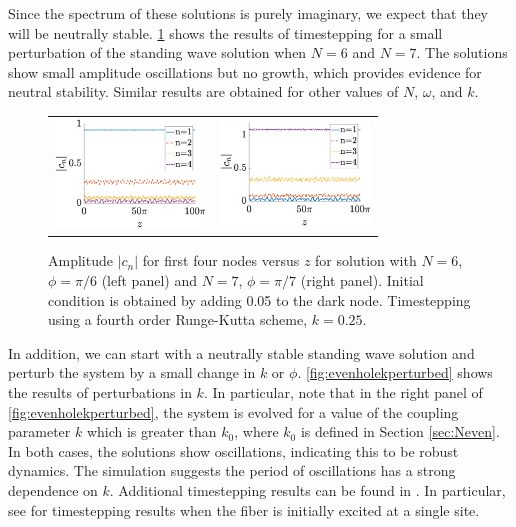 \documentclass[reprint, amsmath,amssymb,aps,pra]{revtex4-2}
\begin{document}
Since the spectrum of these solutions is purely imaginary, we expect that they will be neutrally stable.  \cref{fig:evenhole6perturbed} shows the results of timestepping for a small perturbation of the standing wave solution when $N=6$ and $N=7$. The solutions show small amplitude oscillations but no growth, which provides evidence for neutral stability. Similar results are obtained for other values of $N$, $\omega$, and $k$.
\begin{figure}
\begin{center}
\begin{tabular}{cc}
\includegraphics[width=4cm]{evenhole6perturbed.eps} & 
\includegraphics[width=4cm]{oddhole7perturbed.eps}
\end{tabular}
\end{center}
\caption{Amplitude $|c_n|$ for first four nodes versus $z$ for solution with $N=6$,  $\phi = \pi/6$ (left panel) and $N=7$, $\phi = \pi/7$ (right panel). Initial condition is obtained by adding 0.05 to the dark node. Timestepping using a fourth order Runge-Kutta scheme, $k=0.25$.}
\label{fig:evenhole6perturbed}
\end{figure}
In addition, we can start with a neutrally stable standing wave solution and perturb the system by a small change in $k$ or $\phi$. \cref{fig:evenholekperturbed} shows the results of perturbations in $k$. In particular, note that in the right panel of \cref{fig:evenholekperturbed}, the system is evolved for a value of the coupling parameter $k$ which is greater than $k_0$, where $k_0$ is defined in Section \ref{sec:Neven}. In both cases, the solutions show oscillations, indicating this to be robust dynamics. The simulation suggests the period of oscillations has a strong dependence on $k$. Additional timestepping results can be found in \cite{castro2016}. In particular, see \cite[Figure 4]{castro2016} for timestepping results when the fiber is initially excited at a single site. 
\end{document}
